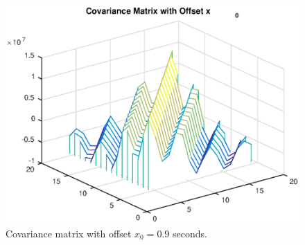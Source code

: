 \begin{figure}[H] 
	\centering 
	\includegraphics[width=\linewidth]{plot_2.eps}
	\caption{Covariance matrix with offset $x_0 = 0.9$ seconds.}
	\label{fig: c1} 
\end{figure}

